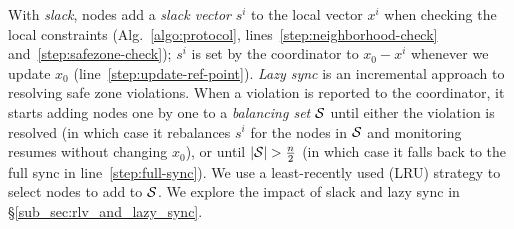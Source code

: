 With \emph{slack}, nodes add a \emph{slack vector} $s^i$ to the local vector $x^i$ when checking the local constraints (Alg.~\ref{algo:protocol}, lines~\ref{step:neighborhood-check} and~\ref{step:safezone-check});
$s^i$ is set by the coordinator to $x_0 - x^i$ whenever we update $x_0$ (line~\ref{step:update-ref-point}).
%
\emph{Lazy sync} is an incremental approach to resolving safe zone violations.
When a violation is reported to the coordinator, it starts adding nodes one by one to a \emph{balancing set} $\mathcal{S}$ until either the violation is resolved (in which case it rebalances $s^i$ for the nodes in $\mathcal{S}$ and monitoring resumes without changing $x_0$), or until $\vert \mathcal{S} \vert > \frac{n}{2}$ (in which case it falls back to the full sync in line~\ref{step:full-sync}).
We use a least-recently used (LRU) strategy to select nodes to add to $\mathcal{S}$.
%
We explore the impact of slack and lazy sync in \S\ref{sub_sec:rlv_and_lazy_sync}.
